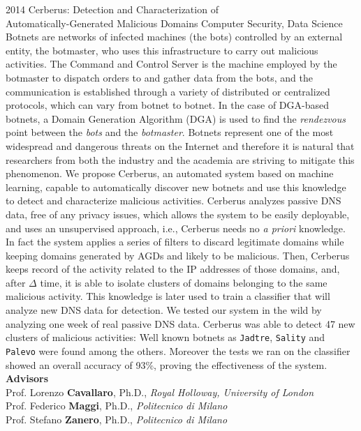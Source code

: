 \documentclass[]{friggeri-cv} %
\begin{document}
\begin{entrylist}
\entry
{2014}
{Cerberus: Detection and Characterization of \\ Automatically-Generated Malicious Domains}
{Computer Security, Data Science}
{Botnets are networks of infected machines (the bots) controlled
by an external entity, the botmaster, who uses this infrastructure to
carry out malicious activities. The Command and Control Server is the machine
employed by the botmaster to dispatch orders to and gather data from the bots,
and the communication is established through a variety of distributed or
centralized protocols, which can vary from botnet to botnet. In the case of
DGA-based botnets, a Domain Generation Algorithm (DGA) is used to find the
\emph{rendezvous} point between the \emph{bots} and the \emph{botmaster}.
Botnets represent one of the most widespread and dangerous threats on the Internet and
therefore it is natural that researchers from both the industry and the academia
are striving to mitigate this phenomenon.
We propose Cerberus, an automated system based on machine learning, capable to automatically discover new botnets and use this
knowledge to detect and characterize malicious activities. Cerberus analyzes passive
DNS data, free of any privacy issues, which allows the system to be easily
deployable, and uses an unsupervised approach, i.e., Cerberus needs no
\emph{a priori} knowledge. In fact the system applies a series of filters to
discard legitimate domains while keeping domains generated by AGDs and likely to be malicious. Then, Cerberus
keeps record of the activity related to the IP addresses of those domains, and,
after $\Delta$ time, it is able to isolate clusters of domains belonging to the same
malicious activity. This knowledge is later used to train a classifier that will analyze
new DNS data for detection.
We tested our system in the wild by analyzing one week of real passive DNS data.
Cerberus was able to detect 47 new clusters of malicious activities: Well
known botnets as \texttt{Jadtre}, \texttt{Sality} and \texttt{Palevo} were found among the others.
Moreover the tests we ran on the classifier showed an overall accuracy of 93\%, proving
the effectiveness of the system. \\

\textbf{Advisors}\\
Prof. Lorenzo \textbf{Cavallaro}, Ph.D., \emph{Royal Holloway, University of London} \\
Prof. Federico \textbf{Maggi}, Ph.D., \emph{Politecnico di Milano} \\
Prof. Stefano \textbf{Zanero}, Ph.D., \emph{Politecnico di Milano}}
\end{entrylist}
\end{document}
